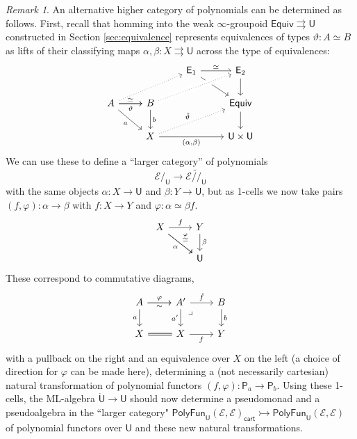 \documentclass[12pt,reqno]{amsart}
\newcommand{\EE}{\ensuremath{\mathcal{E}}}
\newcommand{\alg}[1]{\ensuremath{\mathsf{#1}}}
\newcommand{\mono}{\ensuremath{\rightarrowtail}}
\renewcommand{\to}{\ensuremath{\rightarrow}}
\newcommand{\tto}{\ensuremath{\rightrightarrows}}
\newcommand{\T}{\ensuremath{\mathsf{U}}}
\newcommand{\TT}{\ensuremath{\dot{\mathsf{U}}}}
\newcommand{\pbcorner}{\arrow[dr,phantom,"\lrcorner" very near start, shift right=.5ex]} %
\theoremstyle{remark}
\newtheorem{remark}[theorem]{Remark}
\theoremstyle{definition}
\begin{document}
\begin{remark}\label{remark:Anel}
An alternative higher category of polynomials can be determined as follows. First, recall that homming into the weak $\infty$-groupoid $\mathsf{Equiv} \tto \T$ constructed in Section \ref{sec:equivalence} represents equivalences of types $\vartheta : A \simeq B$ as lifts of their classifying maps $\alpha, \beta : X \tto \T$ across the type of equivalences:
\begin{equation}\label{diag:equivdef2}
\begin{tikzcd} 
	&& \mathsf{E}_1 \ar[rd]  \ar[r,"{\simeq}"]  & \mathsf{E}_2 \ar[d] \\  
A \ar[rd,swap, "a"] \ar[r,swap, "{\vartheta}"]  \ar[r, "{\simeq}"]  \ar[rru, dotted] & B \ar[d, "b"] \ar[rru, crossing over, dotted] && \mathsf{Equiv} \ar[d] \\  
& X \ar[rru, dotted, "{\tilde{\vartheta}}"] \ar[rr, swap, "{(\alpha, \beta)}"] && \T \times \T
	 \end{tikzcd}
 \end{equation}
We can use these to define a ``larger category'' of polynomials $$\EE/_\T \to \EE\widetilde{/\!/}_\T$$ with the same objects $\alpha: X \to \T$ and $\beta : Y\to \T$, but as 1-cells we now take pairs $(f, \varphi) : \alpha \to \beta$ with $f : X \to Y$ and $\varphi : \alpha \simeq \beta f$.
\begin{equation}\label{diag:new1cells}
\begin{tikzcd}
X \ar[r,swap,swap, "{f}"] \ar[rd,swap, "\alpha"] \ar[dr, "{\stackrel{\varphi}{\simeq}}"]&  Y \ar[d, "\beta"] \\
& \T
\end{tikzcd}
\end{equation}
These correspond to commutative diagrams,
\begin{equation}\label{diag:new1cells2}
\begin{tikzcd}
 A \ar[r, "{\varphi}"] \ar[r,swap, "{\sim}"] \ar[d,swap, "a"] & A' \ar[d, swap, "a'"]  \ar[r, "{\dot{f}}"]   \pbcorner & B \ar[d, "b"] \\  
 X \ar[r, equals] & X \ar[r,swap, "{f}"] &  Y
 \end{tikzcd}
 \end{equation}
 with a pullback on the right and an equivalence over $X$ on the left (a choice of direction for $\varphi$ can be made here),
determining a (not necessarily cartesian) natural transformation of polynomial functors $(f, \varphi) : \alg{P}_a \to \alg{P}_b$.  Using these 1-cells, the ML-algebra $\TT\to\T$ should now determine a pseudomonad and a pseudoalgebra in the ``larger category" $\mathsf{PolyFun}_\T(\EE, \EE)_\mathsf{cart} \mono \mathsf{PolyFun}_\T(\EE, \EE)$ of polynomial functors over $\T$ and these new natural transformations.


\end{remark}
\end{document}
